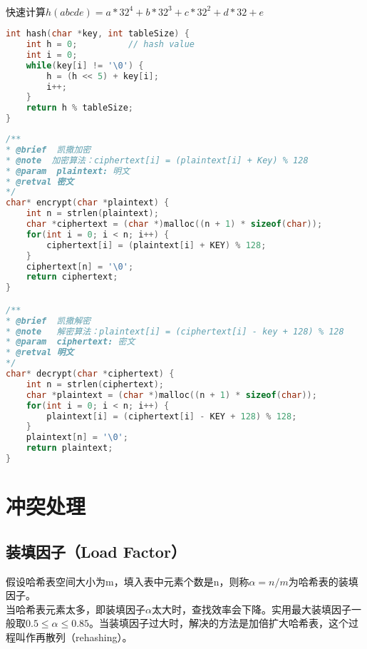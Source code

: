 \\

快速计算$ h(abcde) = a * 32^4 + b * 32^3 + c * 32^2 + d * 32 + e $

\begin{lstlisting}[language=C]
int hash(char *key, int tableSize) {
    int h = 0;          // hash value
    int i = 0;
    while(key[i] != '\0') {
        h = (h << 5) + key[i];
        i++;
    }
    return h % tableSize;
}
\end{lstlisting}

\vspace{0.5cm}


\begin{lstlisting}[language=C]
/**
* @brief  凯撒加密
* @note  加密算法：ciphertext[i] = (plaintext[i] + Key) % 128
* @param  plaintext: 明文
* @retval 密文
*/
char* encrypt(char *plaintext) {
    int n = strlen(plaintext);
    char *ciphertext = (char *)malloc((n + 1) * sizeof(char));
    for(int i = 0; i < n; i++) {
        ciphertext[i] = (plaintext[i] + KEY) % 128;
    }
    ciphertext[n] = '\0';
    return ciphertext;
}

/**
* @brief  凯撒解密
* @note   解密算法：plaintext[i] = (ciphertext[i] - key + 128) % 128
* @param  ciphertext: 密文
* @retval 明文
*/
char* decrypt(char *ciphertext) {
    int n = strlen(ciphertext);
    char *plaintext = (char *)malloc((n + 1) * sizeof(char));
    for(int i = 0; i < n; i++) {
        plaintext[i] = (ciphertext[i] - KEY + 128) % 128;
    }
    plaintext[n] = '\0';
    return plaintext;
}
\end{lstlisting}

\newpage

\section{冲突处理}

\subsection{装填因子（Load Factor）}

假设哈希表空间大小为m，填入表中元素个数是n，则称$ \alpha = n / m $为哈希表的装填因子。\\

当哈希表元素太多，即装填因子$ \alpha $太大时，查找效率会下降。实用最大装填因子一般取$ 0.5 \le \alpha \le 0.85 $。当装填因子过大时，解决的方法是加倍扩大哈希表，这个过程叫作再散列（rehashing）。\\


